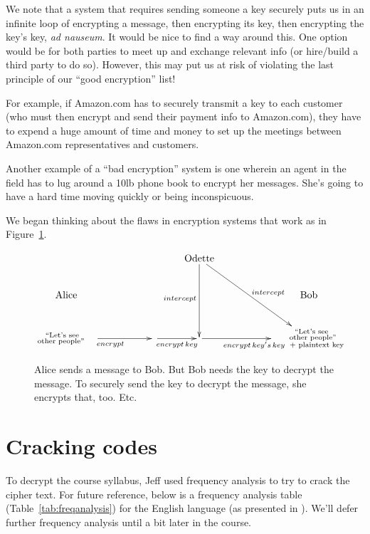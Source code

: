 We note that a system that requires sending someone a key securely puts us in an infinite loop of encrypting a message, then encrypting its key, then encrypting the key's key, \textit{ad nauseum}.  It would be nice to find a way around this.  One option would be for both parties to meet up and exchange relevant info (or hire/build a third party to do so).  However, this may put us at risk of violating the last principle of our ``good encryption'' list!

For example, if Amazon.com has to securely transmit a key to each customer (who must then encrypt and send their payment info to Amazon.com), they have to expend a huge amount of time and money to set up the meetings between Amazon.com representatives and customers.  

Another example of a ``bad encryption'' system is one wherein an agent in the field has to lug around a 10lb phone book to encrypt her messages.  She's going to have a hard time moving quickly or being inconspicuous. 

We began thinking about the flaws in encryption systems that work as in Figure~\ref{fig:flawed}.

\begin{figure}[!h]\label{fig:flawed}
\centering
\[
\xymatrix{ 
             & & & \text{Odette} \ar[dd]_{intercept} \ar[ddrr]^{intercept} & & \\
\text{Alice} & & &     &          & \text{Bob} \\
{\substack{\text{``Let's see\quad } \\ \text{other people'' \quad}}} \ar[rr]_{encrypt}       &      & \ar[r]_{encrypt\,key} & \ar[rr]_{encrypt\, key's\, key}  &               & {\substack{\text{\quad ``Let's see } \\ \text{\quad other people''} \\ \text{\qquad + plaintext key}}}
}
\]
\caption{Alice sends a message to Bob.  But Bob needs the key to decrypt the message.  To securely send the key to decrypt the message, she encrypts that, too.  Etc.}
\end{figure}

\section{Cracking codes}

To decrypt the course syllabus, Jeff used frequency analysis to try to crack the cipher text.  For future reference, below is a frequency analysis table (Table~\ref{tab:freqanalysis}) for the English language (as presented in \cite{Singh}).  We'll defer further frequency analysis until a bit later in the course.

